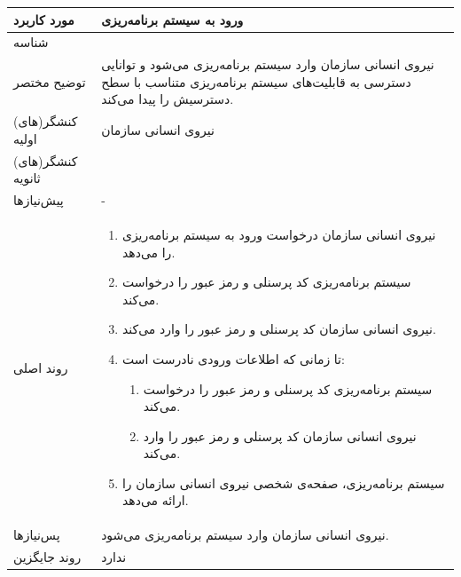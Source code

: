 \begin{table}[H]
	\centering
	\begin{tabular}{|p{3cm}|p{10cm}|}
		\hline
		مورد کاربرد & ورود به سیستم برنامه‌ریزی  \\
		\hline
		شناسه & 
		\stepcounter{usecase_ID}
		\arabic{usecase_ID} \\
		\hline
		توضیح مختصر & نیروی انسانی سازمان وارد سیستم برنامه‌ریزی می‌شود و توانایی دسترسی به قابلیت‌های سیستم برنامه‌ریزی متناسب با سطح دسترسیش را پیدا می‌کند. \\
		\hline
		کنشگر(های) اولیه & نیروی انسانی سازمان \\
		\hline
		کنشگر(های) ثانویه &  \\
		\hline
		پیش‌نیازها & - \\
		\hline
		
		روند اصلی &
		\begin{enumerate}[topsep=0cm,leftmargin=0.5cm]
			\item نیروی انسانی سازمان درخواست ورود به سیستم برنامه‌ریزی را می‌دهد.
			\item سیستم برنامه‌ریزی کد پرسنلی و رمز عبور را درخواست می‌کند. 
			\item نیروی انسانی سازمان کد پرسنلی و رمز عبور را وارد می‌کند. 
			\item تا زمانی که اطلاعات ورودی نادرست است: 
			\begin{enumerate}[topsep=0cm,leftmargin=0.5cm]
				\item سیستم برنامه‌ریزی کد پرسنلی و رمز عبور را درخواست می‌کند. 
				\item نیروی انسانی سازمان کد پرسنلی و رمز عبور را وارد می‌کند. 
			\end{enumerate}
			\item سیستم برنامه‌ریزی، صفحه‌ی شخصی نیروی انسانی سازمان را ارائه می‌دهد. 
		\end{enumerate} \\
		
		\hline
		پس‌نیازها & نیروی انسانی سازمان وارد سیستم برنامه‌ریزی می‌شود. \\
		\hline
		روند جایگزین & ندارد \\
		\hline
	\end{tabular}
\end{table}

